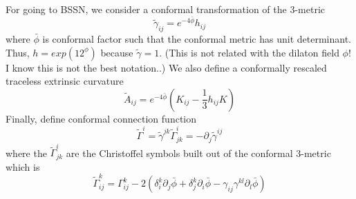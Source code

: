 \documentclass[prd]{revtex4}
\begin{document}
For going to BSSN, we consider a conformal transformation of the 3-metric
\begin{equation}
\tilde{\gamma}_{ij} = e^{-4 \bar{\phi}} h_{ij}
\end{equation}
where $\bar{\phi}$ is conformal factor such that the conformal metric has unit determinant. Thus, $h = exp(12^\phi)$ because $\tilde{\gamma}=1$. (This is not related with the dilaton field $\phi$! I know this is not the best notation..) We also define a conformally rescaled traceless extrinsic curvature
\begin{equation}
\tilde{A}_{ij} = e^{-4 \bar{\phi}} \left(K_{ij} - \frac{1}{3} h_{ij} K \right)
\end{equation}
Finally, define conformal connection function
\begin{equation}
\tilde{\Gamma}^i = \tilde{\gamma}^{jk} \tilde{\Gamma}_{jk}^i = - \partial_j \tilde{\gamma}^{ij}
\end{equation}
where the $\tilde{\Gamma}_{jk}^i$ are the Christoffel symbols built out of the conformal 3-metric which is
\begin{equation}
\tilde{\Gamma}_{ij}^k = \Gamma_{ij}^k - 2 (\delta_i^k \partial_j \bar{\phi} + \delta_j^k \partial_i \bar{\phi} - \gamma_{ij} \gamma^{kl} \partial_l \bar{\phi})
\end{equation}
\end{document}
